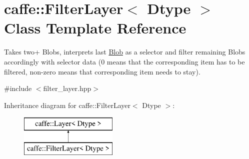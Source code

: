 \hypertarget{classcaffe_1_1FilterLayer}{}\section{caffe\+:\+:Filter\+Layer$<$ Dtype $>$ Class Template Reference}
\label{classcaffe_1_1FilterLayer}


Takes two+ Blobs, interprets last \hyperlink{classcaffe_1_1Blob}{Blob} as a selector and filter remaining Blobs accordingly with selector data (0 means that the corresponding item has to be filtered, non-\/zero means that corresponding item needs to stay).  




{\ttfamily \#include $<$filter\+\_\+layer.\+hpp$>$}

Inheritance diagram for caffe\+:\+:Filter\+Layer$<$ Dtype $>$\+:\begin{figure}[H]
\begin{center}
\leavevmode
\includegraphics[height=2.000000cm]{classcaffe_1_1FilterLayer}
\end{center}
\end{figure}

